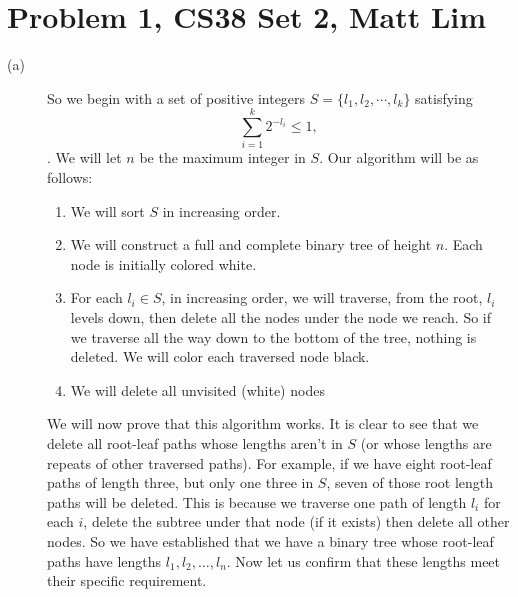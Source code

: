 \documentclass{article}
\begin{document}
\section*{Problem 1, CS38 Set 2, Matt Lim}
\begin{description}
    \item[(a)]
        So we begin with a set of positive integers $S = \{l_1,l_2, \cdots,
        l_k\}$
        satisfying
        \[\sum_{i=1}^k 2^{-l_i} \le 1,\]
        .
        We will let $n$ be the maximum integer in $S$. Our algorithm will be as follows:

        \begin{enumerate}
            \item We will sort $S$ in increasing order.
            \item We will construct a full and complete binary tree of height
                $n$. Each node is initially colored white.
            \item For each $l_i \in S$, in increasing order, we will traverse,
                from the root, $l_i$ levels down, then delete all the nodes under the
                node we reach. So if we traverse all the way down to the bottom
                of the tree, nothing is deleted. We will color each traversed node black.
            \item We will delete all unvisited (white) nodes
        \end{enumerate}

        We will now prove that this algorithm works. It is clear to see that we
        delete all root-leaf paths whose lengths aren't in $S$ (or whose lengths
        are repeats of other traversed paths). For example, if we have eight
        root-leaf paths of length three, but only one three in $S$, seven of those root length
        paths will be deleted. This is because we traverse one path of length
        $l_i$ for each $i$, delete the subtree under that node (if it exists)
        then delete all other nodes. So we have established that we have a
        binary tree whose root-leaf paths have lengths $l_1, l_2, \dots, l_n$.
        Now let us confirm that these lengths meet their specific requirement.


\end{description}
\end{document}
